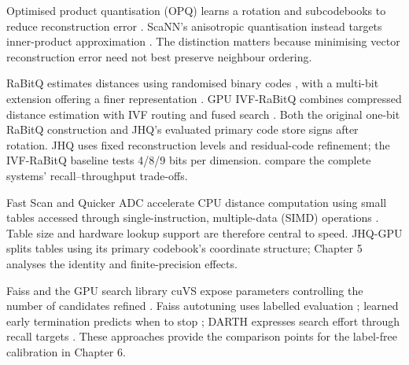 Optimised product quantisation (OPQ) learns a rotation and subcodebooks
to reduce reconstruction error \cite{opq}. ScaNN's anisotropic
quantisation instead targets inner-product approximation \cite{scann}.
The distinction matters because minimising vector reconstruction error
need not best preserve neighbour ordering.

RaBitQ estimates distances using randomised binary codes \cite{rabitq},
with a multi-bit extension offering a finer representation \cite{rabitq_multi}.
GPU IVF-RaBitQ combines compressed distance estimation with IVF routing
and fused search \cite{ivfrabitq}. Both the original one-bit RaBitQ
construction and JHQ's evaluated primary code store signs after rotation.
JHQ uses fixed reconstruction levels and residual-code refinement;
the IVF-RaBitQ baseline tests 4/8/9 bits per dimension.
 compare the complete systems'
recall--throughput trade-offs.

Fast Scan and Quicker ADC accelerate CPU distance computation using
small tables accessed through single-instruction, multiple-data (SIMD)
operations \cite{fastscan,quickeradc}. Table size and hardware lookup support are therefore central to speed.
JHQ-GPU splits tables using its primary codebook's coordinate structure;
Chapter 5 analyses the identity and finite-precision effects.

Faiss and the GPU search library cuVS expose parameters controlling the
number of candidates refined \cite{faiss_refine,cuvs_refinement}.
Faiss autotuning uses labelled evaluation \cite{faiss_autotune}; learned
early termination predicts when to stop \cite{li_termination}; DARTH
expresses search effort through recall targets \cite{darth}.
These approaches provide the comparison points for the label-free
calibration in Chapter 6.
